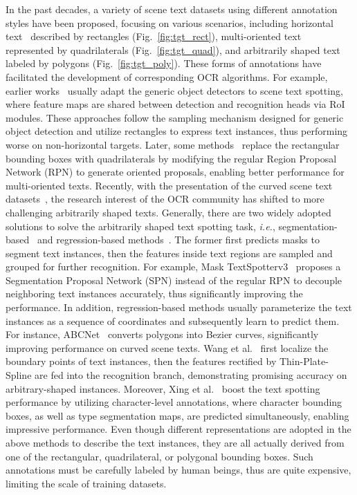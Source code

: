 \documentclass[sigconf]{acmart}
\begin{document}
In the past decades, a variety of scene text datasets using different annotation styles have been proposed, focusing on various scenarios, including horizontal text~\cite{karatzas2013icdar, karatzas2011icdar} described by rectangles (Fig.~\ref{fig:tgt_rect}), multi-oriented text~\cite{karatzas2015icdar, nayef2019icdar2019} represented by quadrilaterals (Fig.~\ref{fig:tgt_quad}), and arbitrarily shaped text~\cite{ch2017total, liu2019curved, chng2019icdar2019} labeled by polygons (Fig.~\ref{fig:tgt_poly}). These forms of annotations have facilitated the development of corresponding OCR algorithms. For example, earlier works~\cite{li2017towards} usually adapt the generic object detectors to scene text spotting, where feature maps are shared between detection and recognition heads via RoI modules. These approaches follow the sampling mechanism designed for generic object detection and utilize rectangles to express text instances, thus performing worse on non-horizontal targets. Later, some methods~\cite{busta2017deep, he2018end, liu2018fots} replace the rectangular bounding boxes with quadrilaterals by modifying the regular Region Proposal Network (RPN) to generate oriented proposals, enabling better performance for multi-oriented texts. Recently, with the presentation of the curved scene text datasets~\cite{ch2017total, liu2019curved, chng2019icdar2019}, the research interest of the OCR community has shifted to more challenging arbitrarily shaped texts. Generally, there are two widely adopted solutions to solve the arbitrarily shaped text spotting task, \emph{i.e.}, segmentation-based~\cite{liao2020masktext, qiao2021mango, wang2021pan++, qin2019towards} and regression-based methods~\cite{liu2020abcnet, boundary2020, feng2019textdragon}. The former first predicts masks to segment text instances, then the features inside text regions are sampled and grouped for further recognition. For example, Mask TextSpotterv3~\cite{liao2020masktext} proposes a Segmentation Proposal Network (SPN) instead of the regular RPN to decouple neighboring text instances accurately, thus significantly improving the performance. In addition, regression-based methods usually parameterize the text instances as a sequence of coordinates and subsequently learn to predict them. For instance, ABCNet~\cite{liu2020abcnet} converts polygons into Bezier curves, significantly improving performance on curved scene texts. Wang et al.~\cite{boundary2020} first localize the boundary points of text instances, then the features rectified by Thin-Plate-Spline are fed into the recognition branch, demonstrating promising accuracy on arbitrary-shaped instances. Moreover, Xing et al.~\cite{xing2019convolutional} boost the text spotting performance by utilizing character-level annotations, where character bounding boxes, as well as type segmentation maps, are predicted simultaneously, enabling impressive performance. 
Even though different representations are adopted in the above methods to describe the text instances, they are all actually derived from one of the rectangular, quadrilateral, or polygonal bounding boxes. Such annotations must be carefully labeled by human beings, thus are quite expensive, limiting the scale of training datasets.
\end{document}
